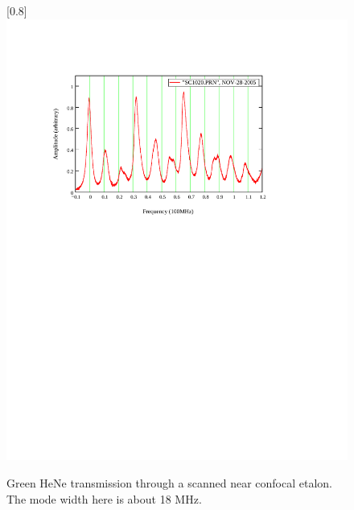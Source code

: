 \begin{figure}
\scalebox{0.8}[0.8]{
\includegraphics[bb=15 440 489 752]
{near_confocal/near_confocal.pdf}
}
\caption[Green HeNe transmission through a scanned near confocal etalon]{Green HeNe transmission through a scanned near confocal etalon. The mode width here is about 18 MHz.}
\label{near_confocal}
\end{figure}
